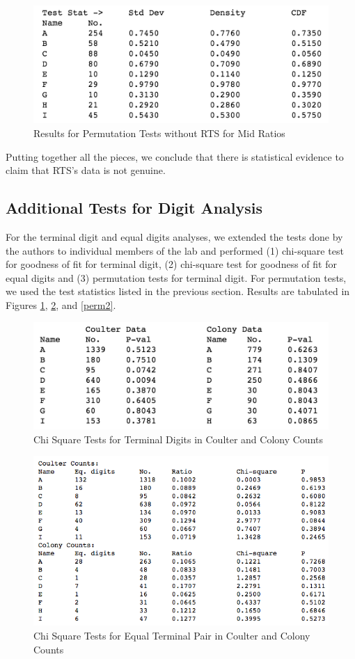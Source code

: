 \documentclass{article}
\begin{document}
\begin{figure}[H]
\centering
\includegraphics[width=0.8\linewidth]{images/mid_ratio_perm_no_rts.png}
\caption{Results for Permutation Tests without RTS  for Mid Ratios}
\end{figure}

Putting together all the pieces, we conclude that there is statistical evidence to claim that RTS's data is not genuine.

    \subsection{Additional Tests for Digit
Analysis}\label{additional-tests-for-digit-analysis}

For the terminal digit and equal digits analyses, we extended the tests done by
the authors to individual members of the lab and performed (1) chi-square test for goodness of fit for terminal digit, (2) chi-square test for goodness of fit for equal digits and (3) permutation tests for terminal digit. For permutation tests, we used the test statistics listed in the previous section. Results are tabulated in Figures \ref{cst1}, \ref{cst2}, and \ref{perm2}.

\begin{figure}[H]
\centering
\includegraphics[width=0.7\linewidth]{images/raaz_term_chi_summary.png}
\caption{Chi Square Tests for Terminal Digits in Coulter and Colony
Counts}
\label{cst1}
\end{figure}

\begin{figure}[H]
\centering
\includegraphics[width=0.9\linewidth]{images/raaz_eq_chi_elaborate.png}
\caption{Chi Square Tests for Equal Terminal Pair in Coulter and Colony
Counts}
\label{cst2}
\end{figure}
\end{document}
